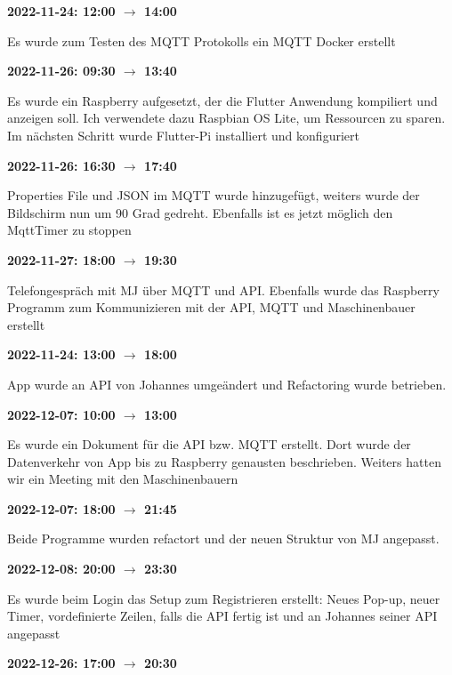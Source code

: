 \vspace{0.5cm} \textbf{2022-11-24: 12:00 $\rightarrow$ 14:00} 

Es wurde zum Testen des MQTT Protokolls ein MQTT Docker erstellt

\vspace{0.5cm} \textbf{2022-11-26: 09:30 $\rightarrow$ 13:40} 

Es wurde ein Raspberry aufgesetzt, der die Flutter Anwendung kompiliert und anzeigen soll. Ich verwendete dazu Raspbian OS Lite, um Ressourcen zu sparen. Im n\"achsten Schritt wurde Flutter-Pi installiert und konfiguriert

\vspace{0.5cm} \textbf{2022-11-26: 16:30 $\rightarrow$ 17:40} 

Properties File und JSON im MQTT wurde hinzugefügt, weiters wurde der Bildschirm nun um 90 Grad gedreht. Ebenfalls ist es jetzt möglich den MqttTimer zu stoppen

\vspace{0.5cm} \textbf{2022-11-27: 18:00 $\rightarrow$ 19:30} 

Telefongespräch mit MJ über MQTT und API. Ebenfalls wurde das Raspberry Programm zum
Kommunizieren mit der API, MQTT und Maschinenbauer erstellt

\vspace{0.5cm} \textbf{2022-11-24: 13:00 $\rightarrow$ 18:00} 

App wurde an API von
Johannes umgeändert und Refactoring wurde betrieben.

\vspace{0.5cm} \textbf{2022-12-07: 10:00 $\rightarrow$ 13:00} 

Es wurde ein Dokument
für die API bzw. MQTT erstellt. Dort wurde der Datenverkehr von App bis
zu Raspberry genausten beschrieben. Weiters hatten wir ein Meeting mit
den Maschinenbauern

\vspace{0.5cm} \textbf{2022-12-07: 18:00 $\rightarrow$ 21:45} 

Beide Programme wurden refactort und der neuen Struktur von MJ angepasst.

\vspace{0.5cm} \textbf{2022-12-08: 20:00 $\rightarrow$ 23:30} 

Es wurde beim Login das
Setup zum Registrieren erstellt: Neues Pop-up, neuer Timer, vordefinierte Zeilen, falls die API fertig ist und an Johannes seiner API angepasst

\vspace{0.5cm} \textbf{2022-12-26: 17:00 $\rightarrow$ 20:30} 

